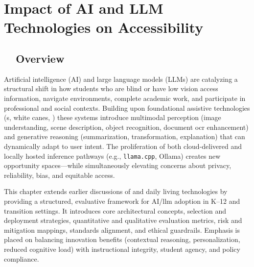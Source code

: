 \chapter{Impact of AI and LLM Technologies on Accessibility}\label{ch9:chap:ai-llm}

\section{~~Overview}\label{ch9:sec:overview}
Artificial intelligence (AI) and large language models (LLMs) are catalyzing a structural shift in how students who are blind or have low vision access information, navigate environments, complete academic work, and participate in professional and social contexts.\supercite{arxiv_visual_impairment, msseeingai, aimodels2024} Building upon foundational assistive technologies (s, white canes, ) these systems introduce multimodal perception (image understanding, scene description, object recognition, document \gls{ocr} enhancement) and generative reasoning (summarization, transformation, explanation) that can dynamically adapt to user intent.\supercite{SeeingAI, IBMAIOCR, ABBYYAIOCR} The proliferation of both cloud-delivered and locally hosted inference pathways (e.g., \texttt{llama.cpp}, Ollama)\supercite{LlamaCpp, Ollama} creates new opportunity spaces—while simultaneously elevating concerns about privacy, reliability, bias, and equitable access.\supercite{AI_Ethics_Bias, Bias_in_AI, DataPrivacyAI}

This chapter extends earlier discussions of  and daily living technologies by providing a structured, evaluative framework for AI/\gls{llm} adoption in K–12 and transition settings. It introduces core architectural concepts, selection and deployment strategies, quantitative and qualitative evaluation metrics, risk and mitigation mappings, standards alignment, and ethical guardrails. Emphasis is placed on balancing innovation benefits (contextual reasoning, personalization, reduced cognitive load) with instructional integrity, student agency, and policy compliance.\supercite{wjaets2024, MicrosoftAIAccessibility, GoogleMLAccessibility}

